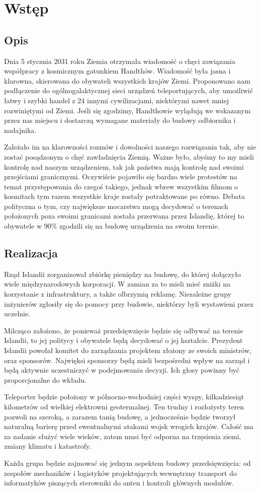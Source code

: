 \section{Wstęp}
\subsection{Opis}
Dnia 5 stycznia 2031 roku Ziemia otrzymała wiadomość o chęci zawiązania współpracy z kosmicznym gatunkiem Handthów.
Wiadomość była jasna i klarowna, skierowana do obywateli wszystkich krajów Ziemi.
Proponowano nam podłączenie do ogólnogalaktycznej sieci urządzeń teleportujących, aby umożliwić łatwy i szybki handel z 24 innymi cywilizacjami, niektórymi nawet mniej rozwiniętymi od Ziemi.
Jeśli się zgodzimy, Handthowie wylądują we wskazanym przez nas miejscu i dostarczą wymagane materiały do budowy odbiornika i nadajnika.

Zależało im na klarowności rozmów i dowolności naszego rozwiązania tak, aby nie zostać posądzonym o chęć zawładnięcia Ziemią.
Ważne było, abyśmy to my mieli kontrolę nad naszym urządzeniem, tak jak państwa mają kontrolę nad swoimi przejściami granicznymi.
Oczywiście pojawiło się bardzo wiele protestów na temat przystępowania do czegoś takiego, jednak wbrew wszystkim filmom o kosmitach tym razem wszystkie kraje zostały potraktowane po równo.
Debata polityczna o tym, czy największe mocarstwa mogą decydować o terenach położonych poza swoimi granicami została przerwana przez Islandię, której to obywatele w 90\% zgodzili się na budowę urządzenia na swoim terenie.

\subsection{Realizacja}
Rząd Islandii zorganizował zbiórkę pieniędzy na budowę, do której dołączyło wiele międzynarodowych korporacji.
W zamian za to mieli mieć zniżki na korzystanie z infrastruktury, a także olbrzymią reklamę.
Niezależne grupy inżynierów zgłosiły się do pomocy przy budowie, niektórzy byli wystawieni przez uczelnie.

Milcząco założono, że ponieważ przedsięwzięcie będzie się odbywać na terenie Islandii, to jej politycy i obywatele będą decydować o jej kształcie.
Prezydent Islandii powołał komitet do zarządzania projektem złożony ze swoich ministrów, oraz sponsorów.
Najwięksi sponsorzy będą mieli bezpośredni wpływ na zarząd i będą aktywnie uczestniczyć w podejmowaniu decyzji.
Ich głosy powinny być proporcjonalne do wkładu.

Teleporter będzie położony w północno-wschodniej części wyspy, kilkadziesiąt kilometrów od wielkiej elektrowni geotermalnej.
Ten trudny i rozłożysty teren pozwoli na szeroką, a zarazem tanią budowę, a jednocześnie będzie tworzył naturalną barierę przed ewentualnymi atakami wojsk wrogich krajów.
Całość ma za zadanie służyć wiele wieków, zatem musi być odporna na trzęsienia ziemi, zmiany klimatu i katastrofy.

Każda grupa będzie zajmować się jednym aspektem budowy przedsięwzięcia: od zespołów mechaników i logistyków projektujących wewnętrzny transport do informatyków piszących sterowniki do anten i kontroli głównych modułów.
